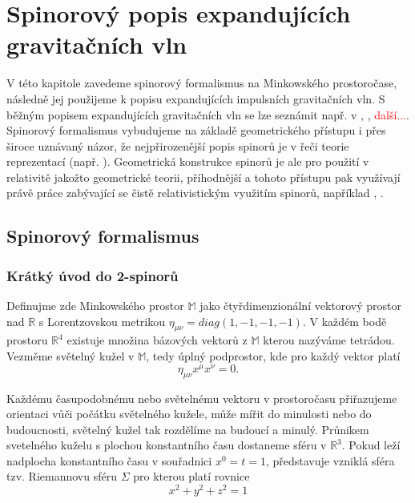 \newcommand{\Ab}{{\boldsymbol{A}}}
\newcommand{\Bb}{{\boldsymbol{B}}}
\newcommand{\Cb}{{\boldsymbol{C}}}
\newcommand{\Db}{{\boldsymbol{D}}}

\chapter{Spinorový popis expandujících gravitačních vln}
V této kapitole zavedeme spinorový formalismus na Minkowského prostoročase, následně jej použijeme k popisu expandujících
impulsních gravitačních vln. S běžným popisem expandujících gravitačních vln se lze seznámit např. v
\cite{Podolsky_1999}, \cite{Podolsky:2016mqg}, \textcolor{red}{další...}.
Spinorový formalismus vybudujeme na základě geometrického přístupu i přes široce uznávaný názor, že
nejpřirozenější popis spinorů je v řeči teorie reprezentací (např. \cite{fecko_2006}). Geometrická konstrukce spinorů je ale pro použití v relativitě jakožto geometrické teorii,
příhodnější a tohoto přístupu pak využívají právě práce zabývající se čistě relativistickým využitím spinorů, například
\cite{penrose_rindler_1984}, \cite{doi:10.1142/5222}.
\section{Spinorový formalismus}
\subsection{Krátký úvod do 2-spinorů}
Definujme zde Minkowského prostor $\mathbb{M}$ jako čtyřdimenzionální vektorový prostor nad $\mathbb{R}$ s Lorentzovskou metrikou
$\eta_{\mu \nu} = diag(1, -1, -1, -1)$. V každém bodě prostoru $\mathbb{R}^4$ existuje množina bázových vektorů z $\mathbb{M}$ kterou
nazýváme tetrádou.
Vezměme světelný kužel v $\mathbb{M}$, tedy úplný podprostor, kde pro každý vektor platí
\begin{equation}
    \eta_{\mu \nu} x^\mu x^\nu = 0.
\end{equation}

Každému časupodobnému nebo světelnému vektoru v prostoročasu přiřazujeme orientaci vůči počátku světelného
kužele, může mířit do minulosti nebo do budoucnosti, světelný kužel tak rozdělíme na budoucí a minulý.
Průnikem svetelného kuželu s plochou konstantního času dostaneme sféru v $\mathbb{R}^3$. Pokud leží nadplocha
konstantního času v souřadnici $x^0 = t =1$, představuje vzniklá sféra tzv. Riemannovu sféru $\Sigma$ pro kterou
platí rovnice
\begin{equation}
    x^2 + y^2 + z^2 = 1
\end{equation} 

